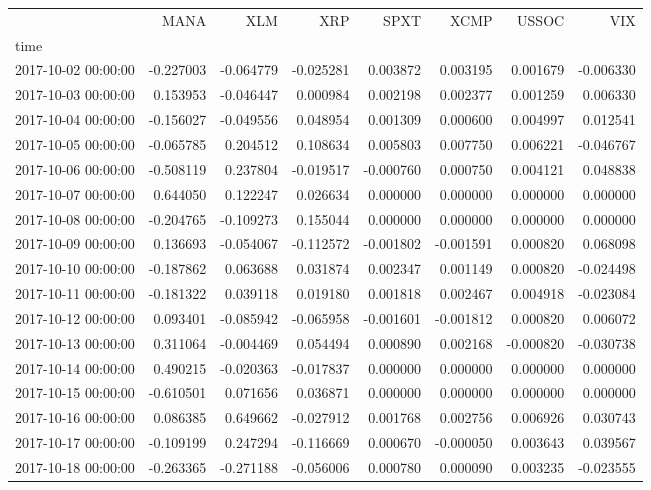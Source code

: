 \begin{tabular}{lrrrrrrr}
\toprule
 & MANA & XLM & XRP & SPXT & XCMP & USSOC & VIX \\
time &  &  &  &  &  &  &  \\
\midrule
2017-10-02 00:00:00 & -0.227003 & -0.064779 & -0.025281 & 0.003872 & 0.003195 & 0.001679 & -0.006330 \\
2017-10-03 00:00:00 & 0.153953 & -0.046447 & 0.000984 & 0.002198 & 0.002377 & 0.001259 & 0.006330 \\
2017-10-04 00:00:00 & -0.156027 & -0.049556 & 0.048954 & 0.001309 & 0.000600 & 0.004997 & 0.012541 \\
2017-10-05 00:00:00 & -0.065785 & 0.204512 & 0.108634 & 0.005803 & 0.007750 & 0.006221 & -0.046767 \\
2017-10-06 00:00:00 & -0.508119 & 0.237804 & -0.019517 & -0.000760 & 0.000750 & 0.004121 & 0.048838 \\
2017-10-07 00:00:00 & 0.644050 & 0.122247 & 0.026634 & 0.000000 & 0.000000 & 0.000000 & 0.000000 \\
2017-10-08 00:00:00 & -0.204765 & -0.109273 & 0.155044 & 0.000000 & 0.000000 & 0.000000 & 0.000000 \\
2017-10-09 00:00:00 & 0.136693 & -0.054067 & -0.112572 & -0.001802 & -0.001591 & 0.000820 & 0.068098 \\
2017-10-10 00:00:00 & -0.187862 & 0.063688 & 0.031874 & 0.002347 & 0.001149 & 0.000820 & -0.024498 \\
2017-10-11 00:00:00 & -0.181322 & 0.039118 & 0.019180 & 0.001818 & 0.002467 & 0.004918 & -0.023084 \\
2017-10-12 00:00:00 & 0.093401 & -0.085942 & -0.065958 & -0.001601 & -0.001812 & 0.000820 & 0.006072 \\
2017-10-13 00:00:00 & 0.311064 & -0.004469 & 0.054494 & 0.000890 & 0.002168 & -0.000820 & -0.030738 \\
2017-10-14 00:00:00 & 0.490215 & -0.020363 & -0.017837 & 0.000000 & 0.000000 & 0.000000 & 0.000000 \\
2017-10-15 00:00:00 & -0.610501 & 0.071656 & 0.036871 & 0.000000 & 0.000000 & 0.000000 & 0.000000 \\
2017-10-16 00:00:00 & 0.086385 & 0.649662 & -0.027912 & 0.001768 & 0.002756 & 0.006926 & 0.030743 \\
2017-10-17 00:00:00 & -0.109199 & 0.247294 & -0.116669 & 0.000670 & -0.000050 & 0.003643 & 0.039567 \\
2017-10-18 00:00:00 & -0.263365 & -0.271188 & -0.056006 & 0.000780 & 0.000090 & 0.003235 & -0.023555 \\

\end{tabular}

